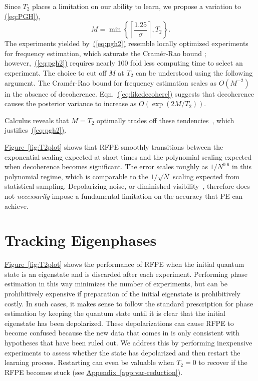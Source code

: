 \documentclass[aps,pra,amsmath,twocolumn,amssymb,superscriptaddress]{revtex4-1}
\newcommand{\eq}[1]{\hyperref[eq:#1]{(\ref*{eq:#1})}}
\newcommand{\app}[1]{\hyperref[app:#1]{Appendix~\ref*{app:#1}}}
\newcommand{\fig}[1]{\hyperref[fig:#1]{Figure~\ref*{fig:#1}}}
\begin{document}
Since $T_2$ places a limitation on our ability to learn, we propose a variation to \eq{PGH},
\begin{equation}
    \label{eq:pgh2}
    M = \min\left\{\left\lceil\frac{1.25}{\sigma}\right\rceil, T_2 \right\}.
\end{equation}
The experiments yielded by~\eq{pgh2} resemble locally optimized experiments for frequency estimation, which saturate the Cram\'er-Rao bound \cite{ferrie_how_2013}; however,~\eq{pgh2} requires nearly 100 fold less computing time to select an experiment.
The choice to cut off $M$ at $T_2$ can be understood using the following argument.  The Cram\'er-Rao bound for frequency estimation scales as $O(M^{-2})$~\cite{WGC15} in the absence of decoherence.  Eqn.~\eq{likedecohere} suggests that decoherence causes the posterior variance to increase as $O(\exp(2M/T_2))$. { Calculus reveals that $M=T_2$ optimally trades off these tendencies~\cite{ferrie_how_2013}, which justifies~\eq{pgh2}.

\fig{T2plot} shows that RFPE smoothly transitions between the exponential scaling expected at short times and the polynomial scaling expected when decoherence becomes significant.  The error scales roughly as $1/N^{0.6}$ in this polynomial regime, which is comparable to the $1/\sqrt{N}$ scaling expected from statistical sampling.  Depolarizing noise, or diminished visibility~\cite{hayes_swarm_2014}, therefore does not \emph{necessarily} impose a fundamental limitation on the accuracy that PE can achieve.



\section{Tracking Eigenphases}

\fig{T2plot} shows the performance of RFPE when the initial quantum state is an eigenstate and is discarded after each experiment.  Performing phase estimation in this way minimizes the number of experiments, but can be prohibitively expensive if preparation of the initial eigenstate is prohibitively costly.  In such cases, it makes sense to follow the standard prescription for phase estimation by keeping the quantum state until it is clear that the initial eigenstate has been depolarized.  These depolarizations can cause RFPE to become confused because the new data that comes in is only consistent with hypotheses that have been ruled out.  We address this by performing inexpensive experiments to assess whether the state has depolarized and then restart the learning process. Restarting can even be valuable when $T_2=0$ to recover if the RFPE becomes stuck (see \app{var-reduction}).

}
\end{document}
